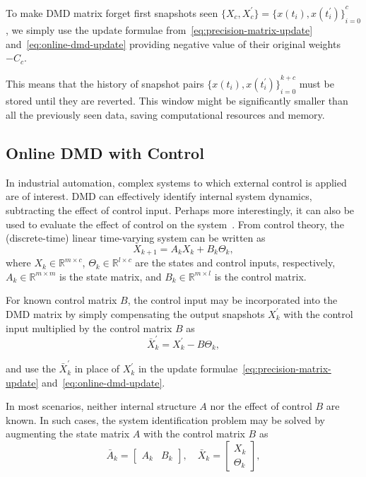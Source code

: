 To make DMD matrix forget first snapshots seen \( \{X_{c}, X^\prime_{c}\} = {\{x(t_i), x(t_i^\prime )\}}^c_{i=0}\), we simply use the update formulae from~\eqref{eq:precision-matrix-update} and~\eqref{eq:online-dmd-update} providing negative value of their original weights \(-C_{c}\).

This means that the history of snapshot pairs \({\{x(t_i), x(t_i^\prime )\}}^{k+c}_{i=0}\) must be stored until they are reverted. This window might be significantly smaller than all the previously seen data, saving computational resources and memory.

\subsection{Online DMD with Control}
In industrial automation, complex systems to which external control is applied are of interest. DMD can effectively identify internal system dynamics, subtracting the effect of control input. Perhaps more interestingly, it can also be used to evaluate the effect of control on the system~\cite{Proctor2016}. From control theory, the (discrete-time) linear time-varying system can be written as
\begin{equation}\label{eq:linear-system}
    X_{k+1} = A_k X_{k} + B_k \Theta_{k},
\end{equation}
where \(X_k \in \mathbb{R}^{m \times c}\), \(\Theta_k \in \mathbb{R}^{l \times c}\) are the states and control inputs, respectively, \(A_k \in \mathbb{R}^{m \times m}\) is the state matrix, and \(B_k \in \mathbb{R}^{m \times l}\) is the control matrix.

For known control matrix \(B\), the control input may be incorporated into the DMD matrix by simply compensating the output snapshots \(X^\prime_k\) with the control input multiplied by the control matrix \(B\) as
\begin{equation}\label{eq:control-compensation}
    \bar{X}^\prime_k = X^\prime_k - B \Theta_k,
\end{equation}

and use the \(\bar{X}^\prime_k\) in place of \(X^\prime_k\) in the update formulae~\eqref{eq:precision-matrix-update} and~\eqref{eq:online-dmd-update}.

In most scenarios, neither internal structure \(A\) nor the effect of control \(B\) are known. In such cases, the system identification problem may be solved by augmenting the state matrix \(A\) with the control matrix \(B\) as
\begin{equation}\label{eq:augmented-matrix}
    \bar{A}_k = \begin{bmatrix} A_k & B_k \end{bmatrix}, \quad \bar{X}_k = \begin{bmatrix} X_k \\ \Theta_k \end{bmatrix} ,
\end{equation}

